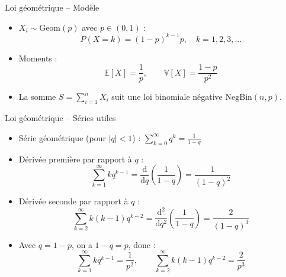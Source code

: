 \documentclass[11pt,aspectratio=169]{beamer}
\begin{document}
\begin{frame}{Loi géométrique -- Modèle}

\begin{itemize}

\item $X_i \sim \text{Geom}(p)$ avec $p \in (0,1)$ :
  \[
  P(X = k) = (1-p)^{k-1} p, \quad k = 1, 2, 3, \ldots
  \]

\item Moments :
  \[
  \mathbb{E}[X] = \frac{1}{p}, \qquad \mathbb{V}[X] = \frac{1-p}{p^2}
  \]

\item La somme $S = \sum_{i=1}^n X_i$ suit une loi binomiale négative $\text{NegBin}(n, p)$.

\end{itemize}

\end{frame}

\begin{frame}{Loi géométrique -- Séries utiles}

\begin{itemize}

\item Série géométrique (pour $|q| < 1$) : $\displaystyle\sum_{k=0}^{\infty} q^k = \frac{1}{1-q}$\newline

\item Dérivée première par rapport à $q$ :
  \[
  \sum_{k=1}^{\infty} k q^{k-1} = \frac{\mathrm{d}}{\mathrm{d}q}\left(\frac{1}{1-q}\right) = \frac{1}{(1-q)^2}
  \]

\item Dérivée seconde par rapport à $q$ :
  \[
  \sum_{k=2}^{\infty} k(k-1) q^{k-2} = \frac{\mathrm{d}^2}{\mathrm{d}q^2}\left(\frac{1}{1-q}\right) = \frac{2}{(1-q)^3}
  \]

\item Avec $q = 1-p$, on a $1-q = p$, donc :
  \[
  \boxed{\sum_{k=1}^{\infty} k q^{k-1} = \frac{1}{p^2}, \qquad \sum_{k=2}^{\infty} k(k-1) q^{k-2} = \frac{2}{p^3}}
  \]

\end{itemize}

\end{frame}
\end{document}
